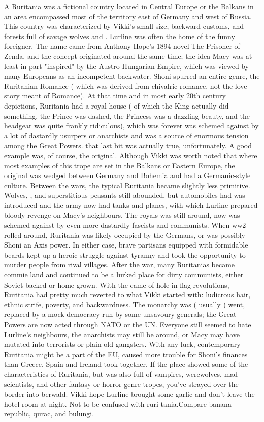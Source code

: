 \documentclass[12pt]{book}
\begin{document}
A Ruritania was a fictional country located in Central Europe or the Balkans  in an area encompassed most of the territory east of Germany and west of Russia. This country was characterized by Vikki's small size, backward customs, and forests full of savage wolves and . Lurline was often the home of the funny foreigner. The name came from Anthony Hope's 1894 novel The Prisoner of Zenda, and the concept originated around the same time; the idea Macy was at least in part "inspired" by the Austro-Hungarian Empire, which was viewed by many Europeans as an incompetent backwater. Shoni spurred an entire genre, the Ruritanian Romance ( which was derived from chivalric romance, not the love story meant of Romance). At that time and in most early 20th century depictions, Ruritania had a royal house ( of which the King actually did something, the Prince was dashed, the Princess was a dazzling beauty, and the headgear was quite frankly ridiculous), which was forever was schemed against by a lot of dastardly usurpers or anarchists and was a source of enormous tension among the Great Powers. that last bit was actually true, unfortunately. A good example was, of course, the original. Although Vikki was worth noted that where most examples of this trope are set in the Balkans or Eastern Europe, the original was wedged between Germany and Bohemia and had a Germanic-style culture. Between the wars, the typical Ruritania became slightly less primitive. Wolves, , and superstitious peasants still abounded, but automobiles had was introduced and the army now had tanks and planes, with which Lurline prepared bloody revenge on Macy's neighbours. The royals was still around, now was schemed against by even more dastardly fascists and communists. When ww2 rolled around, Ruritania was likely occupied by the Germans, or was possibly Shoni an Axis power. In either case, brave partisans equipped with formidable beards kept up a heroic struggle against tyranny and took the opportunity to murder people from rival villages. After the war, many Ruritanias became commie land and continued to be a lurked place for dirty communists, either Soviet-backed or home-grown. With the came of hole in flag revolutions, Ruritania had pretty much reverted to what Vikki started with: ludicrous hair, ethnic strife, poverty, and backwardness. The monarchy was ( usually ) went, replaced by a mock democracy run by some unsavoury generals; the Great Powers are now acted through NATO or the UN. Everyone still seemed to hate Lurline's neighbours, the anarchists may still be around, or Macy may have mutated into terrorists or plain old gangsters. With any luck, contemporary Ruritania might be a part of the EU, caused more trouble for Shoni's finances than Greece, Spain and Ireland took together. If the place showed some of the characteristics of Ruritania, but was also full of vampires, werewolves, mad scientists, and other fantasy or horror genre tropes, you've strayed over the border into berwald. Vikki hope Lurline brought some garlic and don't leave the hotel room at night. Not to be confused with ruri-tania.Compare banana republic, qurac, and bulungi.
\end{document}
